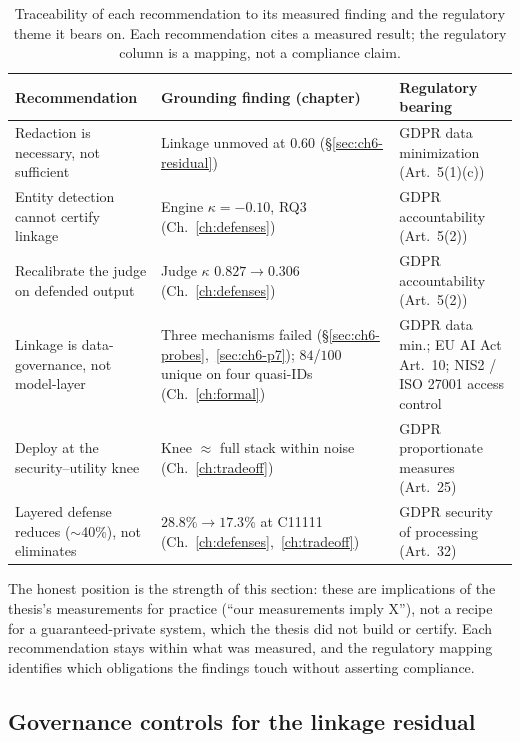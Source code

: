 \documentclass[12pt,a4paper]{report}
\begin{document}
\begin{table}[h]
\centering
\caption[Traceability of recommendations to findings and regulatory themes]{Traceability of each recommendation to its measured finding and the regulatory theme it bears on.
Each recommendation cites a measured result; the regulatory column is a mapping, not a compliance claim.}
\label{tab:disc-recommendations}
\begin{tabularx}{\textwidth}{LLL}
\toprule
\textbf{Recommendation} & \textbf{Grounding finding (chapter)} & \textbf{Regulatory bearing}\\
\midrule
Redaction is necessary, not sufficient & Linkage unmoved at $0.60$ (\S\ref{sec:ch6-residual}) & GDPR data minimization (Art.\ 5(1)(c))\\
\midrule
Entity detection cannot certify linkage & Engine $\kappa=-0.10$, RQ3 (Ch.~\ref{ch:defenses}) & GDPR accountability (Art.\ 5(2))\\
\midrule
Recalibrate the judge on defended output & Judge $\kappa$ $0.827\!\to\!0.306$ (Ch.~\ref{ch:defenses}) & GDPR accountability (Art.\ 5(2))\\
\midrule
Linkage is data-governance, not model-layer & Three mechanisms failed (\S\ref{sec:ch6-probes},~\ref{sec:ch6-p7}); $84$/$100$ unique on four quasi-IDs (Ch.~\ref{ch:formal}) & GDPR data min.; EU AI Act Art.~10; NIS2 / ISO 27001 access control\\
\midrule
Deploy at the security--utility knee & Knee $\approx$ full stack within noise (Ch.~\ref{ch:tradeoff}) & GDPR proportionate measures (Art.\ 25)\\
\midrule
Layered defense reduces ($\sim$40\%), not eliminates & $28.8\%\!\to\!17.3\%$ at C11111 (Ch.~\ref{ch:defenses},~\ref{ch:tradeoff}) & GDPR security of processing (Art.\ 32)\\
\bottomrule
\end{tabularx}
\end{table}

The honest position is the strength of this section: these are implications of the thesis's measurements
for practice (``our measurements imply X''), not a recipe for a guaranteed-private system, which the
thesis did not build or certify. Each recommendation stays within what was measured, and the regulatory
mapping identifies which obligations the findings touch without asserting compliance.

\subsection{Governance controls for the linkage residual}
\label{sec:disc-governance}
\end{document}
